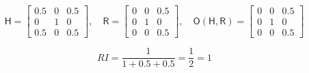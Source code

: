 \begin{equation}
\label{eq:routine-example-2}
    \mathsf{H} = 
    \begin{bmatrix}
    0.5 & 0 & 0.5\\
    0   & 1 & 0 \\
    0.5 & 0 & 0.5
    \end{bmatrix},\quad
    \mathsf{R} = 
    \begin{bmatrix}
    0 & 0 & 0.5\\
    0 & 1 & 0\\
    0 & 0 & 0.5
    \end{bmatrix},\quad
    \mathsf{O}(\mathsf{H}, \mathsf{R}) = 
    \begin{bmatrix}
    0 & 0 & 0.5\\
    0 & 1 & 0\\
    0 & 0 & 0.5
    \end{bmatrix}
\end{equation}

\begin{equation}
    \label{eq:routine-index-2}
    RI = \frac{1}{1 + 0.5 + 0.5} = \frac{1}{2} = 1
\end{equation}

